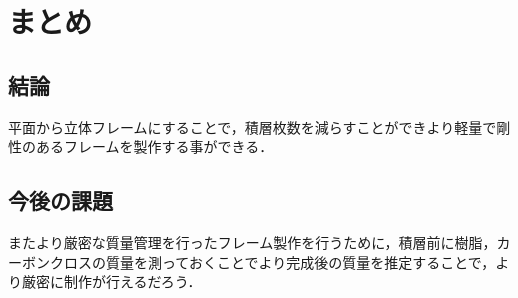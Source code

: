 \chapter{まとめ}
\section{結論}
平面から立体フレームにすることで，積層枚数を減らすことができより軽量で剛性のあるフレームを製作する事ができる．

\section{今後の課題}
またより厳密な質量管理を行ったフレーム製作を行うために，積層前に樹脂，カーボンクロスの質量を測っておくことでより完成後の質量を推定することで，より厳密に制作が行えるだろう．